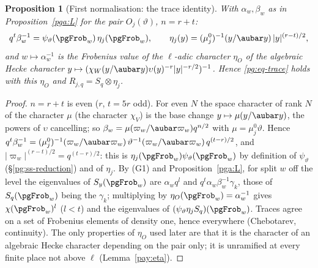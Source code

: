 \documentclass[10pt]{amsart}
\newtheorem{proposition}[theorem]{Proposition}
\theoremstyle{definition}
\theoremstyle{remark}
\begin{document}
\begin{proposition}[First normalisation: the trace identity]\label{pga:trace}
With $\alpha_w,\beta_w$ as in Proposition~\ref{pga:L} for the pair $O_j(\vartheta)$, $n=r+t$:
\[
q^t\beta_w^{-1}=\psi_\vartheta(\pgFrob_w)\,\eta_j(\pgFrob_w),\qquad
\eta_j(y)=(\mu_j^0)^{-1}(y/\aubar y)\,|y|^{(r-t)/2},
\]
and $w\mapsto\alpha_w^{-1}$ is the Frobenius value of the $\ell$-adic character $\eta_O$ of the
algebraic Hecke character $y\mapsto(\chi_W(y/\aubar y)\upsilon(y)^{-r}|y|^{-r/2})^{-1}$. Hence
\eqref{pg:eq-trace} holds with this $\eta_O$ and $R_{j,q}=S_q\otimes\eta_j$.
\end{proposition}
\begin{proof}
$n=r+t$ is even ($r$, $t=5r$ odd). For even $N$ the space character of rank $N$ of the
character $\mu$ (the character $\chi_V$) is the
base change $y\mapsto\mu(y/\aubar y)$, the powers of $\upsilon$ cancelling; so $\beta_w=\mu(\varpi_w/\aubar\varpi_w)q^{n/2}$ with
$\mu=\mu_j^0\vartheta$. Hence $q^t\beta_w^{-1}=(\mu_j^0)^{-1}(\varpi_w/\aubar\varpi_w)\,
\vartheta^{-1}(\varpi_w/\aubar\varpi_w)\,q^{(t-r)/2}$, and $|\varpi_w|^{(r-t)/2}=q^{(t-r)/2}$:
this is $\eta_j(\pgFrob_w)\psi_\vartheta(\pgFrob_w)$ by definition of $\psi_\vartheta$
(\S\ref{pg:ss-reduction}) and of $\eta_j$. By (G1) and
Proposition~\ref{pga:L}, for split $w$ off the level the eigenvalues of $S_y(\pgFrob_w)$ are
$\alpha_wq^l$ and $q^t\alpha_w\beta_w^{-1}\gamma_k$, those of $S_q(\pgFrob_w)$ being the
$\gamma_k$; multiplying by $\eta_O(\pgFrob_w)=\alpha_w^{-1}$ gives $\chi(\pgFrob_w)^l$ ($l<t$) and
the eigenvalues of $(\psi_\vartheta\eta_jS_q)(\pgFrob_w)$. Traces agree on a set of Frobenius
elements of density one, hence everywhere (Chebotarev, continuity). The only properties of
$\eta_O$ used later are that it is the character of an algebraic Hecke character depending on the
pair only; it is unramified at every finite place not above $\ell$ (Lemma~\ref{pay:eta}).
\end{proof}
\end{document}
